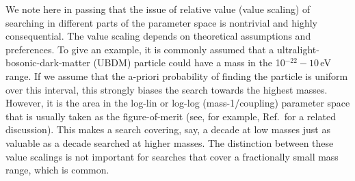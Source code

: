 \documentclass{WileyMSP-template}
\newcommand{\DK}[1]{\textcolor{brown}{Derek: #1}}
\begin{document}
	
	We note here in passing that the issue of relative value (value scaling) of searching in different parts of the parameter space is nontrivial and highly consequential. The value scaling depends on theoretical assumptions and preferences. To give an example, it is commonly assumed that a ultralight-bosonic-dark-matter (UBDM) particle could have a mass in the 10$^{-22}-10$\,eV range. If we assume that the a-priori probability of finding the particle is uniform over this interval, this strongly biases the search towards the highest masses. However, it is the area in the log-lin or log-log
	(mass-1/coupling) parameter space that is usually taken as the figure-of-merit (see, for example, Ref.\,\cite{Gedalia_Perez2010HierarchyPhysRevD} for a related discussion). This makes a search covering, say, a decade at low masses just as valuable as a decade searched at higher masses. The distinction between these value scalings is not important for searches that cover a fractionally small mass range, which is common.

	
	
	
	
	
	
\end{document}
